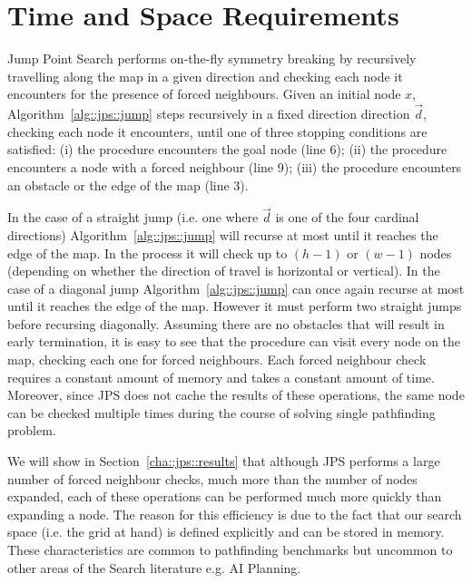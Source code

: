 \section{Time and Space Requirements}
Jump Point Search performs on-the-fly symmetry breaking by recursively travelling
along the map in a given direction and checking each node it encounters for the
presence of forced neighbours. 
Given an initial node $x$, Algorithm~\ref{alg::jps::jump} steps recursively in
a fixed direction direction $\vec{d}$, checking each node it encounters, 
until one of three stopping conditions are satisfied: 
(i) the procedure encounters the goal node (line 6); 
(ii) the procedure encounters a node with a forced neighbour (line 9); 
(iii) the procedure encounters an obstacle or the edge of the map (line 3).  

In the case of a straight jump
(i.e. one where $\vec{d}$ is one of the four cardinal directions)
Algorithm~\ref{alg::jps::jump} will recurse at most until it reaches the edge of
the map. In the process it will check up to $(h-1)$ or $(w-1)$ nodes 
(depending on whether the direction of travel is horizontal or vertical).
In the case of a diagonal jump Algorithm~\ref{alg::jps::jump} can once again
recurse at most until it reaches the edge of the map. However it must perform two 
straight jumps before recursing diagonally. Assuming there are no obstacles that
will result in early termination, it is easy to see that the procedure can visit
every node on the map, checking each one for forced neighbours. 
Each forced neighbour check requires a constant amount of memory and takes a constant
amount of time. Moreover, since JPS does not cache the results of these operations, 
the same node can be checked multiple times during the course of solving single 
pathfinding problem. 

We will show in Section~\ref{cha::jps::results}
that although JPS performs a large number of forced neighbour checks, much more than
the number of nodes expanded, each of these operations can be performed much more 
quickly than expanding a node. The reason for this efficiency is due to the fact that
our search space (i.e. the grid at hand) is defined explicitly and can be stored
in memory. These characteristics are common to pathfinding benchmarks but uncommon 
to other areas of the Search literature e.g. AI Planning. 
